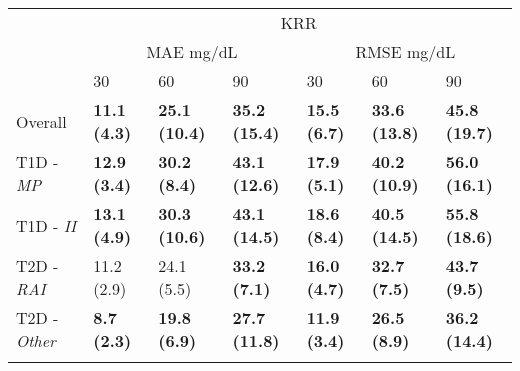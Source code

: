 \begin{table}[b!]
\begin{tabular}{lllllll}
			& \multicolumn{6}{c}{KRR}       \\ \cline{2-7}
			\multicolumn{1}{l|}{}                           & \multicolumn{3}{c|}{MAE mg/dL}          & \multicolumn{3}{c|}{RMSE mg/dL} \\ \cline{2-7}
			\multicolumn{1}{l|}{}                           & 30 & 60 & \multicolumn{1}{l|}{90} & 30 & 60 & \multicolumn{1}{l|}{90}  \\ \hline
			\multicolumn{1}{l|}{Overall}                    & {\bf 11.1 (4.3)} & {\bf 25.1 (10.4)} & \multicolumn{1}{l|}{{\bf 35.2 (15.4)}} & {\bf 15.5 (6.7)} & {\bf 33.6 (13.8)} & \multicolumn{1}{l|}{{\bf 45.8 (19.7)}} \\
			\multicolumn{1}{l|}{T1D - {\sl MP}}   & {\bf12.9 (3.4)} & {\bf 30.2 (8.4)} & \multicolumn{1}{l|}{{\bf 43.1 (12.6)}} & {\bf17.9 (5.1)} & {\bf 40.2 (10.9)} & \multicolumn{1}{l|}{{\bf 56.0 (16.1)}}  \\
			\multicolumn{1}{l|}{T1D - {\sl II}}    & {\bf13.1 (4.9)} & {\bf 30.3 (10.6)}  & \multicolumn{1}{l|}{{\bf 43.1 (14.5)}} & {\bf18.6 (8.4)} & {\bf 40.5 (14.5)} & \multicolumn{1}{l|}{{\bf 55.8 (18.6)}}  \\
			\multicolumn{1}{l|}{T2D - {\sl RAI}} & 11.2 (2.9) & 24.1 (5.5) & \multicolumn{1}{l|}{{\bf 33.2 (7.1)}} & {\bf16.0 (4.7)} & {\bf 32.7 (7.5)} & \multicolumn{1}{l|}{{\bf 43.7 (9.5)}}  \\
			\multicolumn{1}{l|}{T2D - {\sl Other}}      & {\bf8.7 (2.3)} & {\bf 19.8 (6.9)} & \multicolumn{1}{l|}{{\bf 27.7 (11.8)}} & {\bf11.9 (3.4)} & {\bf 26.5 (8.9)} & \multicolumn{1}{l|}{{\bf 36.2 (14.4)}}  \\ \hline
			
			\\
			

\end{tabular}
\end{table}
